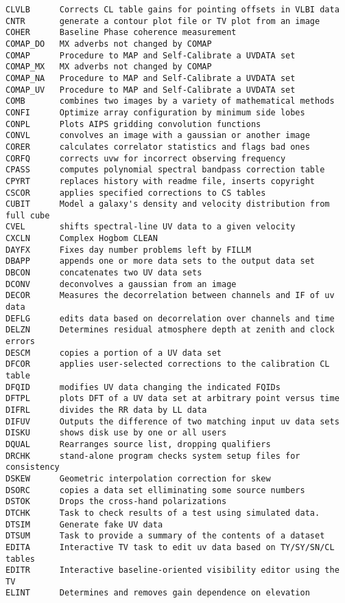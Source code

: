 \begin{verbatim}
CLVLB      Corrects CL table gains for pointing offsets in VLBI data
CNTR       generate a contour plot file or TV plot from an image
COHER      Baseline Phase coherence measurement
COMAP_DO   MX adverbs not changed by COMAP
COMAP      Procedure to MAP and Self-Calibrate a UVDATA set
COMAP_MX   MX adverbs not changed by COMAP
COMAP_NA   Procedure to MAP and Self-Calibrate a UVDATA set
COMAP_UV   Procedure to MAP and Self-Calibrate a UVDATA set
COMB       combines two images by a variety of mathematical methods
CONFI      Optimize array configuration by minimum side lobes
CONPL      Plots AIPS gridding convolution functions
CONVL      convolves an image with a gaussian or another image
CORER      calculates correlator statistics and flags bad ones
CORFQ      corrects uvw for incorrect observing frequency
CPASS      computes polynomial spectral bandpass correction table
CPYRT      replaces history with readme file, inserts copyright
CSCOR      applies specified corrections to CS tables
CUBIT      Model a galaxy's density and velocity distribution from full cube
CVEL       shifts spectral-line UV data to a given velocity
CXCLN      Complex Hogbom CLEAN
DAYFX      Fixes day number problems left by FILLM
DBAPP      appends one or more data sets to the output data set
DBCON      concatenates two UV data sets
DCONV      deconvolves a gaussian from an image
DECOR      Measures the decorrelation between channels and IF of uv data
DEFLG      edits data based on decorrelation over channels and time
DELZN      Determines residual atmosphere depth at zenith and clock errors
DESCM      copies a portion of a UV data set
DFCOR      applies user-selected corrections to the calibration CL table
DFQID      modifies UV data changing the indicated FQIDs
DFTPL      plots DFT of a UV data set at arbitrary point versus time
DIFRL      divides the RR data by LL data
DIFUV      Outputs the difference of two matching input uv data sets
DISKU      shows disk use by one or all users
DQUAL      Rearranges source list, dropping qualifiers
DRCHK      stand-alone program checks system setup files for consistency
DSKEW      Geometric interpolation correction for skew
DSORC      copies a data set elliminating some source numbers
DSTOK      Drops the cross-hand polarizations
DTCHK      Task to check results of a test using simulated data.
DTSIM      Generate fake UV data
DTSUM      Task to provide a summary of the contents of a dataset
EDITA      Interactive TV task to edit uv data based on TY/SY/SN/CL tables
EDITR      Interactive baseline-oriented visibility editor using the TV
ELINT      Determines and removes gain dependence on elevation

\end{verbatim}
